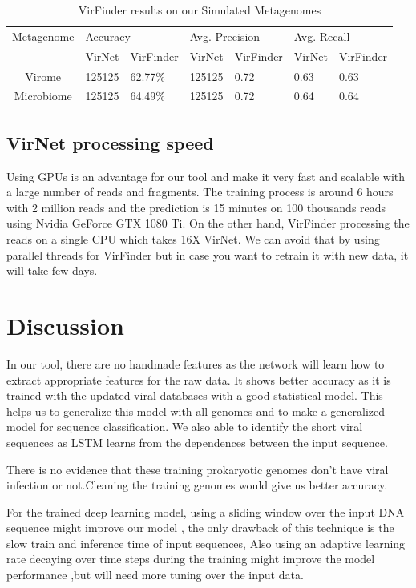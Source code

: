 \documentclass[conference]{IEEEtran}
\begin{document}
\begin{table}[h!]
	\centering
	\begin{tabular}{||c l l l l l l||} 
	Metagenome &	\multicolumn{2}{l}{Accuracy} & \multicolumn{2}{l}{Avg. Precision} & \multicolumn{2}{l}{Avg. Recall}\\ [0.5ex] 
	& VirNet & VirFinder & VirNet & VirFinder & VirNet & VirFinder \\
		\hline\hline
		Virome & 125125 &	62.77\%	& 125125 & 0.72 & 0.63 & 0.63 \\
		Microbiome &	125125 & 64.49\% &	125125 & 0.72 & 0.64 & 0.64 \\ [1ex]
	\end{tabular}
	\caption{VirFinder results on our Simulated Metagenomes}
	\label{table:virfinder_results_simulated}
\end{table}

\subsection{VirNet processing speed}
Using GPUs is an advantage for our tool and make it very fast and scalable with a large number of reads and fragments. The training process is around 6 hours with 2 million reads and the prediction is 15 minutes on 100 thousands reads using Nvidia GeForce GTX 1080 Ti. On the other hand, VirFinder processing the reads on a single CPU which takes 16X VirNet. We can avoid that by using parallel threads for VirFinder but in case you want to retrain it with new data, it will take few days. 

\section{Discussion}

In our tool, there are no handmade features as the network will learn how to extract appropriate features for the raw data. It shows better accuracy as it is trained with the updated viral databases with a good statistical model. This helps us to generalize this model with all genomes and to make a generalized model for sequence classification. We also able to identify the short viral sequences as LSTM learns from the dependences between the input sequence. 

There is no evidence that these training prokaryotic genomes don't have viral infection or not.Cleaning the training genomes would give us better accuracy.

For the trained deep learning model, using a sliding window over the input DNA sequence might improve our model , the only drawback of this technique is the slow train and inference time of input sequences, Also using an adaptive learning rate decaying over time steps during the training might improve the model performance ,but will need more tuning over the input data.
\end{document}
